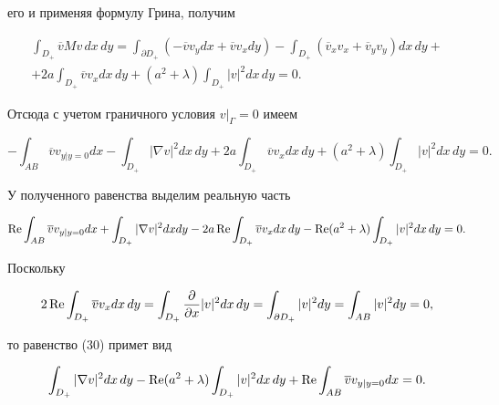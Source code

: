 его и применяя формулу Грина, получим 


\begin{multline*}


\int_{D_+}\overline {v}Mv\,dx\,dy=\int_{\partial D_+}


(-\overline {v}v_ydx+\overline {v}v_xdy)-\int_{D_+}


(\overline {v}_xv_x+\overline {v}_yv_y)dx\,dy+\\


%


+2a\int_{D_+}


\overline {v}v_x dx\,dy+(a^2+\lambda )\int_{D_+}|v|^2dx\,dy=0.


\end{multline*}


Отсюда с учетом граничного условия $v\big|_\Gamma=0$ имеем


$$


-\int_{AB}\overline {v}v_{y|y=0}dx-


\int_{D_+}|\nabla v|^2dx\,dy+


2a\int_{D_+}


\overline {v}v_x dx\,dy+(a^2+\lambda )\int_{D_+}|v|^2dx\,dy=0.


$$


У полученного равенства выделим реальную часть


\begin{equation}


\re\int_{AB}\overline {v}v_{y|y=0}dx+


\int_{D_+}|\nabla v|^2dxdy-2a\re\int_{D_+}


\overline {v}v_x dx\,dy-\re(a^2+\lambda )\int_{D_+}|v|^2dx\,dy=0.


\end{equation}


Поскольку 


$$


2\re\int_{D_+}


\overline {v}v_x dx\,dy=\int_{D_+}


\frac {\partial }{\partial x}|v|^2dx\,dy=


\int_{\partial D_+}|v|^2dy=\int_{AB}|v|^2dy=0,


$$


то равенство (30) примет вид 


\begin{equation}


\int_{D_+}|\nabla v|^2dx\,dy-


\re(a^2+\lambda )\int_{D_+}|v|^2dx\,dy+


\re\int_{AB}\overline vv_{y|y=0}dx=0.


\end{equation}


